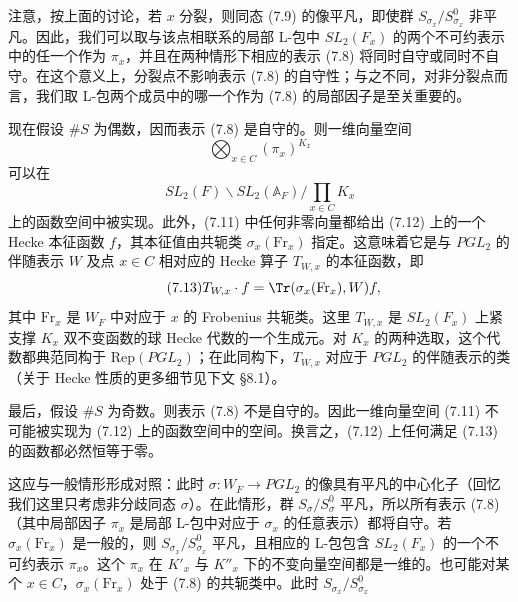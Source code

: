 注意，按上面的讨论，若 $x$ 分裂，则同态 (7.9) 的像平凡，即使群 $S_{\sigma_x}/S_{\sigma_x}^0$ 非平凡。因此，我们可以取与该点相联系的局部 L-包中 $SL_2(F_x)$ 的两个不可约表示中的任一个作为 $\pi_x$，并且在两种情形下相应的表示 (7.8) 将同时自守或同时不自守。在这个意义上，分裂点不影响表示 (7.8) 的自守性；与之不同，对非分裂点而言，我们取 L-包两个成员中的哪一个作为 (7.8) 的局部因子是至关重要的。

现在假设 $\#S$ 为偶数，因而表示 (7.8) 是自守的。则一维向量空间
\begin{equation}\tag{7.11}
\bigotimes_{x\in C}(\pi_x)^{K_x}
\end{equation}
可以在
\begin{equation}\tag{7.12}
SL_2(F)\backslash SL_2(\mathbb{A}_F)\Big/\prod_{x\in C}K_x
\end{equation}
上的函数空间中被实现。此外，(7.11) 中任何非零向量都给出 (7.12) 上的一个 Hecke 本征函数 $f$，其本征值由共轭类 $\sigma_x(\mathrm{Fr}_x)$ 指定。这意味着它是与 $PGL_2$ 的伴随表示 $W$ 及点 $x\in C$ 相对应的 Hecke 算子 $T_{W,x}$ 的本征函数，即
\begin{equation}\tag{7.13}
T_{W,x}\cdot f = \Tr(\sigma_x(\mathrm{Fr}_x),W)f,
\end{equation}
其中 $\mathrm{Fr}_x$ 是 $W_F$ 中对应于 $x$ 的 Frobenius 共轭类。这里 $T_{W,x}$ 是 $SL_2(F_x)$ 上紧支撑 $K_x$ 双不变函数的球 Hecke 代数的一个生成元。对 $K_x$ 的两种选取，这个代数都典范同构于 $\mathrm{Rep}(PGL_2)$；在此同构下，$T_{W,x}$ 对应于 $PGL_2$ 的伴随表示的类（关于 Hecke 性质的更多细节见下文 §8.1）。

最后，假设 $\#S$ 为奇数。则表示 (7.8) 不是自守的。因此一维向量空间 (7.11) 不可能被实现为 (7.12) 上的函数空间中的空间。换言之，(7.12) 上任何满足 (7.13) 的函数都必然恒等于零。

这应与一般情形形成对照：此时 $\sigma: W_F\to PGL_2$ 的像具有平凡的中心化子（回忆我们这里只考虑非分歧同态 $\sigma$）。在此情形，群 $S_\sigma/S_\sigma^0$ 平凡，所以所有表示 (7.8)（其中局部因子 $\pi_x$ 是局部 L-包中对应于 $\sigma_x$ 的任意表示）都将自守。若 $\sigma_x(\mathrm{Fr}_x)$ 是一般的，则 $S_{\sigma_x}/S_{\sigma_x}^0$ 平凡，且相应的 L-包包含 $SL_2(F_x)$ 的一个不可约表示 $\pi_x$。这个 $\pi_x$ 在 $K'_x$ 与 $K''_x$ 下的不变向量空间都是一维的。也可能对某个 $x\in C$，$\sigma_x(\mathrm{Fr}_x)$ 处于 (7.8) 的共轭类中。此时 $S_{\sigma_x}/S_{\sigma_x}^0$

